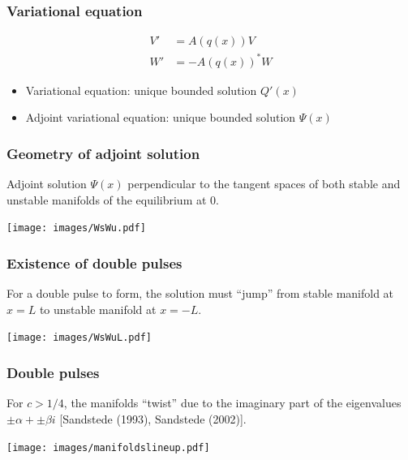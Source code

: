 \documentclass[16pt]{beamer}
\begin{document}
\begin{frame}
	\frametitle{Variational equation}
	\fontsize{16}{7.2}\selectfont

	\begin{align*}
	V' &= A(q(x)) V\\
	W' &= -A(q(x))^* W
	\end{align*}

	\begin{itemize}
		\item Variational equation: unique bounded solution $Q'(x)$
		\vspace{0.5cm}
		\item Adjoint variational equation: unique bounded solution $\Psi(x)$
	\end{itemize}
\end{frame}

\begin{frame}
	\frametitle{Geometry of adjoint solution}
	\fontsize{16}{7.2}\selectfont

	Adjoint solution $\Psi(x)$ perpendicular to the tangent spaces of both stable and unstable manifolds of the equilibrium at 0.

	\begin{center}
		\texttt{[image: images/WsWu.pdf]}
	\end{center}

\end{frame}

\begin{frame}
	\frametitle{Existence of double pulses}
	\fontsize{16}{7.2}\selectfont

	For a double pulse to form, the solution must ``jump'' from stable manifold at $x = L$ to unstable manifold at $x = -L$.

	\begin{center}
		\texttt{[image: images/WsWuL.pdf]}
	\end{center}
\end{frame}

\begin{frame}
	\frametitle{Double pulses}
	\fontsize{16}{7.2}\selectfont

	For $c > 1/4$, the manifolds ``twist'' due to the imaginary part of the eigenvalues $\pm \alpha + \pm \beta i$ \footnotesize [Sandstede (1993), Sandstede (2002)].

	\begin{center}
		\texttt{[image: images/manifoldslineup.pdf]}
	\end{center}
\end{frame}
\end{document}
